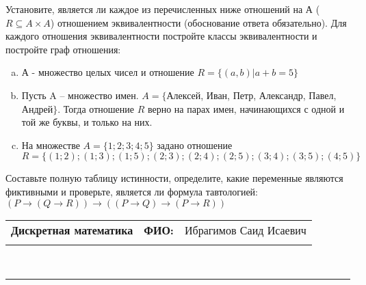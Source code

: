 \documentclass[10pt]{exam}
\newcommand{\class}{Дискретная математика}
\newcommand{\examdate}{}
\begin{document}
\begin{questions}
\question
Установите, является ли каждое из перечисленных ниже отношений на А ($R \subseteq A \times A$) отношением эквивалентности (обоснование ответа обязательно). Для каждого отношения эквивалентности постройте классы 
эквивалентности и постройте граф отношения:
\begin{enumerate} [a)]\setcounter{enumi}{0}
\item А - множество целых чисел и отношение $R = \{(a,b)|a + b = 5\}$
\item Пусть A – множество имен. $A = \{ $Алексей, Иван, Петр, Александр, Павел, Андрей$ \}$. Тогда отношение $R $ верно на парах имен, начинающихся с одной и той же буквы, и только на них.
\item На множестве $A = \{1; 2; 3; 4; 5\}$ задано отношение $R = \{(1; 2); (1; 3); (1; 5); (2; 3); (2; 4); (2; 5); (3; 4); (3; 5); (4; 5)\}$
\end{enumerate}\question Составьте полную таблицу истинности, определите, какие переменные являются фиктивными и проверьте, является ли формула тавтологией:
$(P \rightarrow (Q \rightarrow R)) \rightarrow ((P \rightarrow Q) \rightarrow (P \rightarrow R))$

\end{questions}
\newpage
\begin{flushright}
\begin{tabular}{p{2.8in} r l}
\textbf{\class} & \textbf{ФИО:} &Ибрагимов Саид Исаевич
\\

\textbf{\examdate} &&\\
\end{tabular}\\
\end{flushright}
\rule[1ex]{\textwidth}{.1pt}
\end{document}
